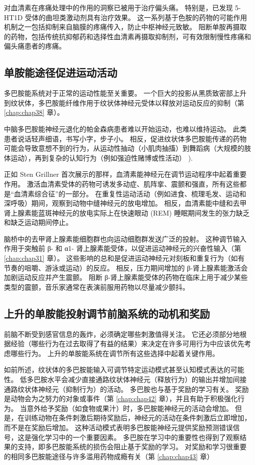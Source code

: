 对血清素在疼痛处理中的作用的洞察已被用于治疗偏头痛。 特别是，已发现 5-HT1D 受体的曲坦类激动剂具有治疗效果。 这一系列基于色胺的药物的可能作用机制之一包括抑制来自脑膜的疼痛传入，防止中枢神经元致敏。 阻断单胺再摄取的药物，包括传统抗抑郁药和选择性血清素再摄取抑制剂，可有效限制慢性疼痛和偏头痛患者的疼痛。



\subsection{单胺能途径促进运动活动}
多巴胺能系统对于正常的运动性能至关重要。 一个巨大的投影从黑质致密部上升到纹状体，多巴胺能纤维作用于纹状体神经元受体以释放对运动反应的抑制（第 \ref{chap:chap38} 章）。

中脑多巴胺能神经元退化的帕金森病患者难以开始运动，也难以维持运动。 此类患者说话轻声细语，书写小字，步子小。 相反，促进纹状体多巴胺能传递的药物可能会导致意想不到的行为，从运动性抽动（小肌肉抽搐）到舞蹈病（大规模的肢体运动），再到复杂的认知行为（例如强迫性赌博或性活动） ).

正如 Sten Grillner 首次展示的那样，血清素能神经元在调节运动程序中起着重要作用。 激活血清素受体的药物可诱发多动症、肌阵挛、震颤和强直，所有这些都是“血清素综合征”的一部分。 在重复性运动活动（例如进食、梳理毛发、运动和深呼吸）期间，观察到动物中缝神经元的放电增加。 相反，血清素能中缝和去甲肾上腺素能蓝斑神经元的放电实际上在快速眼动 (REM) 睡眠期间发生的张力缺乏和缺乏运动期间停止。

脑桥中的去甲肾上腺素能细胞群也向运动细胞群发送广泛的投射。 这种调节输入作用于突触前 β- 和 α1- 肾上腺素能受体，以促进运动神经元的兴奋性输入（第 \ref{chap:chap31} 章）。 这些影响的总和是促进运动神经元对刻板和重复行为（如有节奏的咀嚼、游泳或运动）的反应。 相反，压力期间增加的 β-肾上腺素能激活会加剧运动反应并产生震颤。 阻断 β-肾上腺素能受体的药物在临床上用于减少某些类型的震颤，音乐家通常在表演前服用药物以尽量减少颤抖。

\subsection{上升的单胺能投射调节前脑系统的动机和奖励}
前脑不断受到感官信息的轰炸，必须确定哪些刺激值得关注。 它还必须部分地根据经验（哪些行为在过去取得了有益的结果）来决定在许多可用行为中应该优先考虑哪些行为。 上升的单胺能系统在调节所有这些选择中起着关键作用。

如前所述，纹状体的多巴胺能输入可调节特定运动模式甚至认知模式表达的可能性。 低多巴胺水平会减少直接通路纹状体神经元（释放行为）的输出并增加间接通路纹状体神经元（抑制行为）的活动。 多巴胺也与基于奖励的学习有关。 奖励是动物会为之努力的对象或事件（第 \ref{chap:chap42} 章），并且有助于积极强化行为。 当意外给予奖励（如食物或果汁）时，多巴胺能神经元的活动会增加。 但是，在训练动物在条件刺激后期待奖励后，神经元的活动在条件刺激后立即增加，而不是在奖励后增加。 这种活动模式表明多巴胺能神经元提供奖励预测错误信号，这是强化学习中的一个重要因素。 多巴胺在学习中的重要性也得到了观察结果的支持，即多巴胺能系统的损伤会阻止基于奖励的学习。 对奖励和学习很重要的相同多巴胺能途径与许多滥用药物成瘾有关（第 \ref{chap:chap43} 章）

